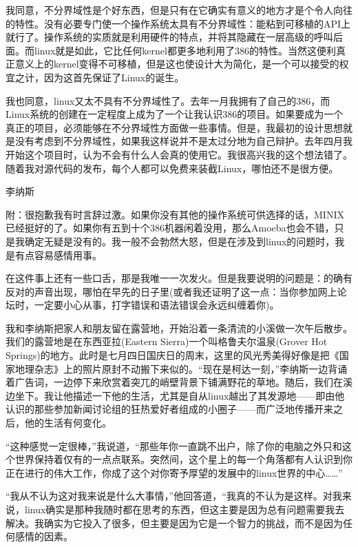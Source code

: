 我同意，不分界域性是个好东西，但是只有在它确实有意义的地方才是个令人向往的特性。没有必要专门使一个操作系统太具有不分界域性：能粘到可移植的API上就行了。操作系统的实质就是利用硬件的特点，并将其隐藏在一层高级的呼叫后面。而linux就是如此，它比任何kernel都更多地利用了386的特性。当然这便利真正意义上的kernel变得不可移植，但是这也使设计大为简化，是一个可以接受的权宜之计，因为这首先保证了Linux的诞生。

我也同意，linux又太不具有不分界域性了。去年一月我拥有了自己的386，而Linux系统的创建在一定程度上成为了一个让我认识386的项目。如果要成为一个真正的项目，必须能够在不分界域性方面做一些事情。但是，我最初的设计思想就是没有考虑到不分界域性，如果我这样说并不是太过分地为自己辩护。去年四月我开始这个项目时，认为不会有什么人会真的使用它。我很高兴我的这个想法错了。随着我对源代码的发布，每个人都可以免费来装截Linux，哪怕还不是很方便。

李纳斯

 

附：很抱歉我有时言辞过激。如果你没有其他的操作系统可供选择的话，MINIX已经挺好的了。如果你有五到十个386机器闲着没用，那么Amoeba也会不错，只是我确定无疑是没有的。我一般不会勃然大怒，但是在涉及到linux的问题时，我是有点容易感情用事。

 

在这件事上还有一些口舌，那是我唯一一次发火。但是我要说明的问题是：的确有反对的声音出现，哪怕在早先的日子里(或者我还证明了这一点：当你参加网上论坛时，一定要小心从事，打字错误和语法错误会永远纠缠着你)。

 

我和李纳斯把家人和朋友留在露营地，开始沿着一条清流的小溪做一次午后散步。我们的露营地是在东西亚拉(Eastern Sierra)一个叫格鲁夫尔温泉(Grover Hot Springs)的地方。此时是七月四日国庆日的周末，这里的风光秀美得好像是把《国家地理杂志》上的照片原封不动搬下来似的。“现在是柯达一刻，”李纳斯一边背诵着广告词，一边停下来欣赏着突兀的峭壁背景下铺满野花的草地。随后，我们在溪边坐下。我让他描述一下他的生活，尤其是自从linux越出了其发源地——即由他认识的那些参加新闻讨论组的狂热爱好者组成的小圈子——而广泛地传播开来之后，他的生活有何变化。

“这种感觉一定很棒，”我说道，“那些年你一直跳不出户，除了你的电脑之外只和这个世界保持着仅有的一点点联系。突然间，这个星上的每一个角落都有人认识到你正在进行的伟大工作，你成了这个对你寄予厚望的发展中的linux世界的中心……”

“我从不认为这对我来说是什么大事情，”他回答道，“我真的不认为是这样。对我来说，linux确实是那种我随时都在思考的东西，但这主要是因为总有问题需要我去解决。我确实为它投入了很多，但主要是因为它是一个智力的挑战，而不是因为任何感情的因素。

